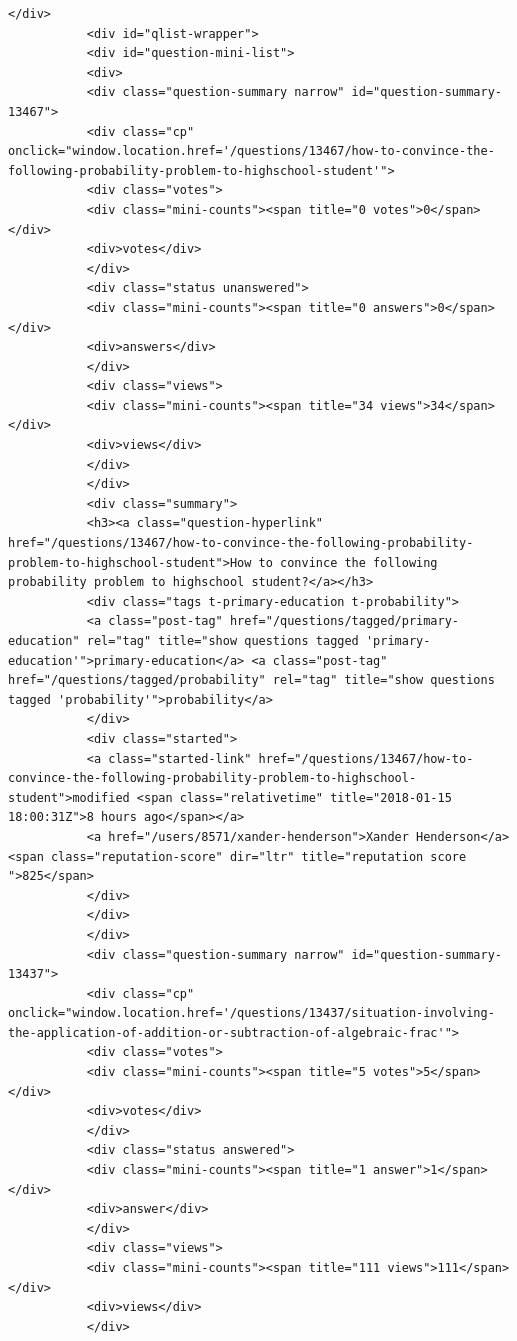 \documentclass[11pt]{article}
\begin{document}
\begin{Verbatim}[commandchars=\\\{\}]
           </div>
           <div id="qlist-wrapper">
           <div id="question-mini-list">
           <div>
           <div class="question-summary narrow" id="question-summary-13467">
           <div class="cp" onclick="window.location.href='/questions/13467/how-to-convince-the-following-probability-problem-to-highschool-student'">
           <div class="votes">
           <div class="mini-counts"><span title="0 votes">0</span></div>
           <div>votes</div>
           </div>
           <div class="status unanswered">
           <div class="mini-counts"><span title="0 answers">0</span></div>
           <div>answers</div>
           </div>
           <div class="views">
           <div class="mini-counts"><span title="34 views">34</span></div>
           <div>views</div>
           </div>
           </div>
           <div class="summary">
           <h3><a class="question-hyperlink" href="/questions/13467/how-to-convince-the-following-probability-problem-to-highschool-student">How to convince the following probability problem to highschool student?</a></h3>
           <div class="tags t-primary-education t-probability">
           <a class="post-tag" href="/questions/tagged/primary-education" rel="tag" title="show questions tagged 'primary-education'">primary-education</a> <a class="post-tag" href="/questions/tagged/probability" rel="tag" title="show questions tagged 'probability'">probability</a>
           </div>
           <div class="started">
           <a class="started-link" href="/questions/13467/how-to-convince-the-following-probability-problem-to-highschool-student">modified <span class="relativetime" title="2018-01-15 18:00:31Z">8 hours ago</span></a>
           <a href="/users/8571/xander-henderson">Xander Henderson</a> <span class="reputation-score" dir="ltr" title="reputation score ">825</span>
           </div>
           </div>
           </div>
           <div class="question-summary narrow" id="question-summary-13437">
           <div class="cp" onclick="window.location.href='/questions/13437/situation-involving-the-application-of-addition-or-subtraction-of-algebraic-frac'">
           <div class="votes">
           <div class="mini-counts"><span title="5 votes">5</span></div>
           <div>votes</div>
           </div>
           <div class="status answered">
           <div class="mini-counts"><span title="1 answer">1</span></div>
           <div>answer</div>
           </div>
           <div class="views">
           <div class="mini-counts"><span title="111 views">111</span></div>
           <div>views</div>
           </div>

\end{Verbatim}
\end{document}
